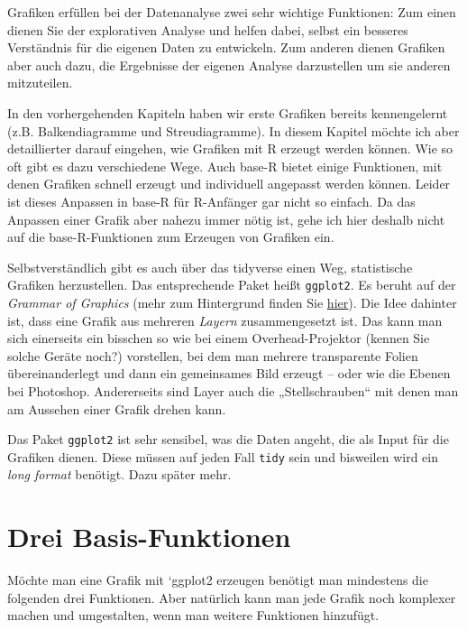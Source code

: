 \documentclass[
]{book}
\begin{document}
Grafiken erfüllen bei der Datenanalyse zwei sehr wichtige Funktionen: Zum einen dienen Sie der explorativen Analyse und helfen dabei, selbst ein besseres Verständnis für die eigenen Daten zu entwickeln. Zum anderen dienen Grafiken aber auch dazu, die Ergebnisse der eigenen Analyse darzustellen um sie anderen mitzuteilen.

In den vorhergehenden Kapiteln haben wir erste Grafiken bereits kennengelernt (z.B. Balkendiagramme und Streudiagramme). In diesem Kapitel möchte ich aber detaillierter darauf eingehen, wie Grafiken mit R erzeugt werden können. Wie so oft gibt es dazu verschiedene Wege. Auch base-R bietet einige Funktionen, mit denen Grafiken schnell erzeugt und individuell angepasst werden können. Leider ist dieses Anpassen in base-R für R-Anfänger gar nicht so einfach. Da das Anpassen einer Grafik aber nahezu immer nötig ist, gehe ich hier deshalb nicht auf die base-R-Funktionen zum Erzeugen von Grafiken ein.

Selbstverständlich gibt es auch über das tidyverse einen Weg, statistische Grafiken herzustellen. Das entsprechende Paket heißt \texttt{ggplot2}. Es beruht auf der \emph{Grammar of Graphics} (mehr zum Hintergrund finden Sie \href{http://vita.had.co.nz/papers/layered-grammar.pdf}{hier}). Die Idee dahinter ist, dass eine Grafik aus mehreren \emph{Layern} zusammengesetzt ist. Das kann man sich einerseits ein bisschen so wie bei einem Overhead-Projektor (kennen Sie solche Geräte noch?) vorstellen, bei dem man mehrere transparente Folien übereinanderlegt und dann ein gemeinsames Bild erzeugt -- oder wie die Ebenen bei Photoshop. Andererseits sind Layer auch die „Stellschrauben`` mit denen man am Aussehen einer Grafik drehen kann.

Das Paket \texttt{ggplot2} ist sehr sensibel, was die Daten angeht, die als Input für die Grafiken dienen. Diese müssen auf jeden Fall \texttt{tidy} sein und bisweilen wird ein \emph{long format} benötigt. Dazu später mehr.

\hypertarget{drei-basis-funktionen}{%
\section{Drei Basis-Funktionen}\label{drei-basis-funktionen}}

Möchte man eine Grafik mit `ggplot2 erzeugen benötigt man mindestens die folgenden drei Funktionen. Aber natürlich kann man jede Grafik noch komplexer machen und umgestalten, wenn man weitere Funktionen hinzufügt.
\end{document}
